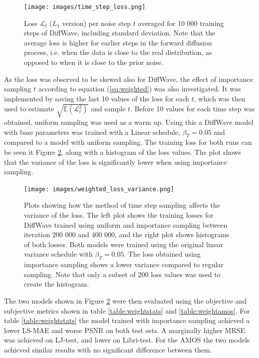 \documentclass{report}
\begin{document}
\begin{figure}[H]
    \centering
    \texttt{[image: images/time\_step\_loss.png]}
    \caption{\onehalfspacing Loss $\mathcal{L}_t$ ($L_1$ version) per noise step $t$ averaged for 10 000 training steps of DiffWave, including standard deviation. Note that the average loss is higher for earlier steps in the forward diffusion process, i.e. when the data is close to the real distribution, as opposed to when it is close to the prior noise.}
    \label{fig:timestep_loss}
\end{figure}

As the loss was observed to be skewed also for DiffWave, the effect of importance sampling $t$ according to equation (\ref{eq:weighted}) was also investigated. It was implemented by saving the last 10 values of the loss for each $t$, which was then used to estimate $\sqrt{\mathbb{E}(\mathcal{L}_t^2)}$ and sample $t$. Before 10 values for each time step was obtained, uniform sampling was used as a warm up. Using this a DiffWave model with base parameters was trained with a Linear schedule, $\beta_T=0.05$ and compared to a model with uniform sampling. The training loss for both runs can be seen it Figure \ref{fig:loss_var}, along with a histogram of the loss values. The plot shows that the variance of the loss is significantly lower when using importance sampling.

\begin{figure}[H]
    \centering
    \texttt{[image: images/weighted\_loss\_variance.png]}
    \caption{\onehalfspacing Plots showing how the method of time step sampling affects the variance of the loss. The left plot shows the training losses for DiffWave trained using uniform and importance sampling between iteration 200 000 and 400 000, and the right plot shows histograms of both losses. Both models were trained using the original linear variance schedule with $\beta_T=0.05$. The loss obtained using importance sampling shows a lower variance compared to regular sampling. Note that only a subset of 200 loss values was used to create the histogram.}
    \label{fig:loss_var}
\end{figure}

The two models shown in Figure \ref{fig:loss_var} were then evaluated using the objective and subjective metrics shown in table \ref{table:weightstats} and \ref{table:weightamos}. For table \ref{table:weightstats} the model trained with importance sampling achieved a lower LS-MAE and worse PSNR on both test sets. A marginally higher MRSE was achieved on LJ-test, and lower on Libri-test. For the AMOS the two models achieved similar results with no significant difference between them.
\end{document}
